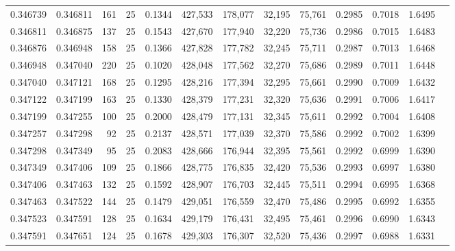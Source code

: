 \begin{tabular}{rrrrrrrrrrrrr}
0.346739 & 0.346811 &   161 &  25 &                                     0.1344 & 427,533 & 178,077 &  32,195 &  75,761 & 0.2985 & 0.7018 & 1.6495 \\
0.346811 & 0.346875 &   137 &  25 &                                     0.1543 & 427,670 & 177,940 &  32,220 &  75,736 & 0.2986 & 0.7015 & 1.6483 \\
0.346876 & 0.346948 &   158 &  25 &                                     0.1366 & 427,828 & 177,782 &  32,245 &  75,711 & 0.2987 & 0.7013 & 1.6468 \\
0.346948 & 0.347040 &   220 &  25 &                                     0.1020 & 428,048 & 177,562 &  32,270 &  75,686 & 0.2989 & 0.7011 & 1.6448 \\
0.347040 & 0.347121 &   168 &  25 &                                     0.1295 & 428,216 & 177,394 &  32,295 &  75,661 & 0.2990 & 0.7009 & 1.6432 \\
0.347122 & 0.347199 &   163 &  25 &                                     0.1330 & 428,379 & 177,231 &  32,320 &  75,636 & 0.2991 & 0.7006 & 1.6417 \\
0.347199 & 0.347255 &   100 &  25 &                                     0.2000 & 428,479 & 177,131 &  32,345 &  75,611 & 0.2992 & 0.7004 & 1.6408 \\
0.347257 & 0.347298 &    92 &  25 &                                     0.2137 & 428,571 & 177,039 &  32,370 &  75,586 & 0.2992 & 0.7002 & 1.6399 \\
0.347298 & 0.347349 &    95 &  25 &                                     0.2083 & 428,666 & 176,944 &  32,395 &  75,561 & 0.2992 & 0.6999 & 1.6390 \\
0.347349 & 0.347406 &   109 &  25 &                                     0.1866 & 428,775 & 176,835 &  32,420 &  75,536 & 0.2993 & 0.6997 & 1.6380 \\
0.347406 & 0.347463 &   132 &  25 &                                     0.1592 & 428,907 & 176,703 &  32,445 &  75,511 & 0.2994 & 0.6995 & 1.6368 \\
0.347463 & 0.347522 &   144 &  25 &                                     0.1479 & 429,051 & 176,559 &  32,470 &  75,486 & 0.2995 & 0.6992 & 1.6355 \\
0.347523 & 0.347591 &   128 &  25 &                                     0.1634 & 429,179 & 176,431 &  32,495 &  75,461 & 0.2996 & 0.6990 & 1.6343 \\
0.347591 & 0.347651 &   124 &  25 &                                     0.1678 & 429,303 & 176,307 &  32,520 &  75,436 & 0.2997 & 0.6988 & 1.6331 \\

\end{tabular}
